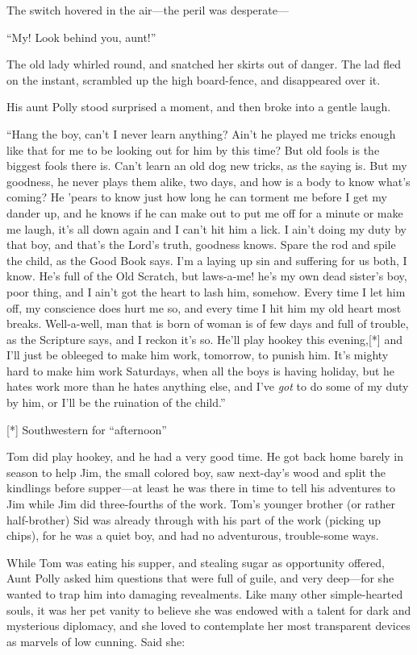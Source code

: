 \documentclass{book}
\begin{document}
The switch hovered in the air—the peril was desperate—

“My! Look behind you, aunt!”

The old lady whirled round, and snatched her skirts out of danger. The lad fled on the instant, scrambled up the high board-fence, and disappeared over it.

His aunt Polly stood surprised a moment, and then broke into a gentle laugh.

“Hang the boy, can’t I never learn anything? Ain’t he played me tricks enough like that for me to be looking out for him by this time? But old fools is the biggest fools there is. Can’t learn an old dog new tricks, as the saying is. But my goodness, he never plays them alike, two days, and how is a body to know what’s coming? He ’pears to know just how long he can torment me before I get my dander up, and he knows if he can make out to put me off for a minute or make me laugh, it’s all down again and I can’t hit him a lick. I ain’t doing my duty by that boy, and that’s the Lord’s truth, goodness knows. Spare the rod and spile the child, as the Good Book says. I’m a laying up sin and suffering for us both, I know. He’s full of the Old Scratch, but laws-a-me! he’s my own dead sister’s boy, poor thing, and I ain’t got the heart to lash him, somehow. Every time I let him off, my conscience does hurt me so, and every time I hit him my old heart most breaks. Well-a-well, man that is born of woman is of few days and full of trouble, as the Scripture says, and I reckon it’s so. He’ll play hookey this evening,[*] and I’ll just be obleeged to make him work, tomorrow, to punish him. It’s mighty hard to make him work Saturdays, when all the boys is having holiday, but he hates work more than he hates anything else, and I’ve \emph{got} to do some of my duty by him, or I’ll be the ruination of the child.”

[*] Southwestern for “afternoon”

Tom did play hookey, and he had a very good time. He got back home barely in season to help Jim, the small colored boy, saw next-day’s wood and split the kindlings before supper—at least he was there in time to tell his adventures to Jim while Jim did three-fourths of the work. Tom’s younger brother (or rather half-brother) Sid was already through with his part of the work (picking up chips), for he was a quiet boy, and had no adventurous, trouble-some ways.

While Tom was eating his supper, and stealing sugar as opportunity offered, Aunt Polly asked him questions that were full of guile, and very deep—for she wanted to trap him into damaging revealments. Like many other simple-hearted souls, it was her pet vanity to believe she was endowed with a talent for dark and mysterious diplomacy, and she loved to contemplate her most transparent devices as marvels of low cunning. Said she:
\end{document}
